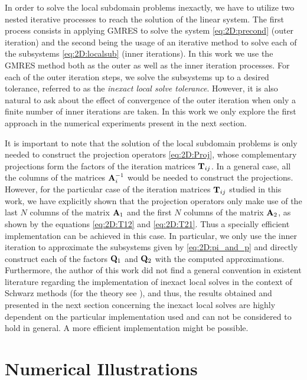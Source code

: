 In order to solve the local subdomain problems inexactly, we have to utilize
two nested iterative processes to reach the solution of the linear system.
The first process consists in applying GMRES to solve the system
\eqref{eq:2D:precond} (outer iteration) and the second being the usage
of an iterative method to solve each of the subsystems \eqref{eq:2D:localsub}
(inner iterations). In this work we use the GMRES method both as the outer as
well as the inner iteration processes. For each of the outer iteration steps,
we solve the subsystems up to a desired tolerance, referred to as the
\textit{inexact local solve tolerance}. However, it is also natural to ask
about the effect of convergence of the outer iteration when only a finite
number of inner iterations are taken. In this work we only explore the first
approach in the numerical experiments present in the next section.

It is important to note that the solution of the local subdomain problems is
only needed to construct the projection operators \eqref{eq:2D:Proj}, whose
complementary projections form the factors of the iteration matrices $\mathbf{T}_{ij}$.
In a general case, all the columns of the matrices $\mathbf{A}_{i}^{-1}$ would be
needed to construct the projections. However, for the particular case of the iteration matrices $\mathbf{T}_{ij}$ studied in this work, we have explicitly shown that the projection operators only make use of the last
$N$ columns of the matrix $\mathbf{A}_1$ and the first $N$ columns of the matrix
$\mathbf{A}_2$, as shown by the equations \eqref{eq:2D:T12} and
\eqref{eq:2D:T21}. Thus a specially efficient implementation can be achieved in this case. In particular, we only use the inner iteration to approximate
the subsystems given by \eqref{eq:2D:pi_and_p} and directly construct each of
the factors $\mathbf{Q}_1$ and $\mathbf{Q}_2$ with the computed approximations. Furthermore,
the author of this work did not find a general convention in existent
literature regarding the implementation of inexact local solves in the context
of Schwarz methods (for the theory see \cite{BenFroNabSzy01}), and thus, the
results obtained and presented in the next section concerning the inexact local
solves are highly dependent on the particular implementation used and can not
be considered to hold in general. A more efficient implementation might be
possible.

\section{Numerical Illustrations}
\label{2D:numerics}


